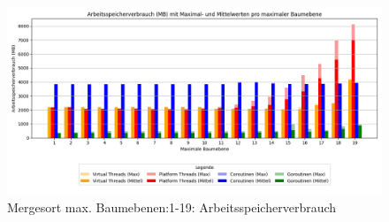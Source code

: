 \documentclass[fontsize=12pt,paper=a4,twoside=semi,parskip=half-,headsepline,headinclude]{scrreprt}
\begin{document}
\begin{figure}[H]
	\centering
	\includegraphics[scale=0.5]{figures/mergesort/Maximalebauebenen1-19_pvcg/memory_usage_bar_plot.png}
	\caption{Mergesort max. Baumebenen:1-19: Arbeitsspeicherverbrauch}
	\label{fig:ms1-19RAM}
\end{figure}
\end{document}
